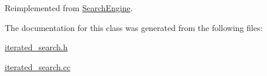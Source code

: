 Reimplemented from \hyperlink{classSearchEngine_a42484decda17a8073d315594de94eb88}{Search\-Engine}.



The documentation for this class was generated from the following files\-:\begin{DoxyCompactItemize}
\item 
\hyperlink{iterated__search_8h}{iterated\-\_\-search.\-h}\item 
\hyperlink{iterated__search_8cc}{iterated\-\_\-search.\-cc}\end{DoxyCompactItemize}

